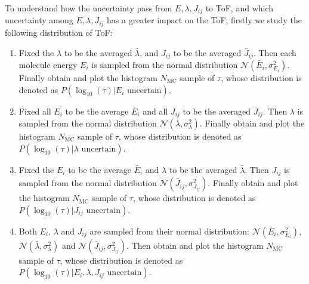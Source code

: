\documentclass[letterpaper,12pt]{article}
\begin{document}
To understand how the uncertainty pass from $E, \lambda, J_{ij}$ to ToF, and 
which uncertainty among $E, \lambda, J_{ij}$ has a greater impact on the ToF, 
firstly we study the following distribution of ToF:
\begin{enumerate}
    \item Fixed the $\lambda$ to be the averaged $\bar{\lambda}$, and $J_{ij}$ to be the averaged $\bar{J}_{ij}$. Then each molecule energy $E_i$ is sampled from the normal distribution $\mathcal{N}(\bar{E}_i, \sigma^2_{E_i})$. Finally obtain and plot the histogram $N_\text{MC}$ sample of $\tau$, whose distribution is denoted as $P(\log_{10}(\tau)|E_i \text{ uncertain})$.
    \item Fixed all $E_i$ to be the average $\bar{E}_i$ and all $J_{ij}$ to be the averaged $\bar{J}_{ij}$. Then $\lambda$ is sampled from the normal distribution $\mathcal{N}(\bar{\lambda}, \sigma^2_{\lambda})$. Finally obtain and plot the histogram  $N_\text{MC}$ sample of $\tau$, whose distribution is denoted as $P(\log_{10}(\tau)|\lambda \text{ uncertain})$. 
    \item Fixed the $E_i$ to be the average $\bar{E}_i$ and $\lambda$ to be the averaged $\bar{\lambda}$. Then $J_{ij}$ is sampled from the normal distribution $\mathcal{N}(\bar{J}_{ij}, \sigma^2_{J_{ij}})$. Finally obtain and plot the histogram  $N_\text{MC}$ sample of $\tau$, whose distribution is denoted as $P(\log_{10}(\tau)|J_{ij} \text{ uncertain})$.
    \item Both $E_i$, $\lambda$ and $J_{ij}$ are sampled from their normal distribution: $\mathcal{N}(\bar{E}_i, \sigma^2_{E_i})$, $\mathcal{N}(\bar{\lambda}, \sigma^2_{\lambda})$ and $\mathcal{N}(\bar{J}_{ij}, \sigma^2_{J_{ij}})$. Then obtain and plot the histogram $N_\text{MC}$ sample of $\tau$, whose distribution is denoted as $P(\log_{10}(\tau)|E_i, \lambda, J_{ij} \text{ uncertain})$.
\end{enumerate}
\end{document}
